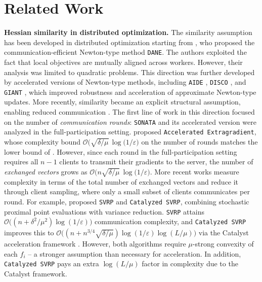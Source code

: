 \documentclass{article}
\begin{document}
\section{Related Work} 
\textbf{Hessian similarity in distributed optimization.} The similarity 
assumption has been developed in distributed optimization starting from 
\cite{shamir2014communication}, who proposed the communication-efficient 
Newton-type method \texttt{DANE}. The authors exploited the fact that local 
objectives are mutually aligned across workers. However, their analysis was 
limited to quadratic problems. This direction was further developed by 
accelerated versions of Newton-type methods, including \texttt{AIDE} 
\cite{reddi2016aide}, \texttt{DISCO} \cite{pmlr-v37-zhangb15}, and 
\texttt{GIANT} \cite{wang2018giant}, which improved robustness and 
acceleration of approximate Newton-type updates. More recently, similarity 
became an explicit structural assumption, enabling reduced communication 
\cite{tian2022acceleration}. The first line of work in this direction 
focused on the number of \textit{communication rounds}: \texttt{SONATA} 
\cite{sun2022distributed} and its accelerated version 
\cite{tian2022acceleration} were analyzed in the full-participation setting. 
\cite{kovalev2022optimal} proposed \texttt{Accelerated Extragradient}, whose complexity bound $\mathcal{O}\bigl(\sqrt{\delta/\mu} \, \log(1/ \varepsilon \bigr)$ 
on the number of rounds matches the lower bound of 
\cite{arjevani2015communication}. However, since each round in the 
full-participation setting requires all $n-1$ clients to transmit their 
gradients to the server, the number of \textit{exchanged vectors} grows as 
$\mathcal{O}\bigl(n\sqrt{\delta/\mu} \, \log(1/ \varepsilon\bigr)$. More recent works 
measure complexity in terms of the total number of exchanged vectors and 
reduce it through client sampling, where only a small subset of clients 
communicates per round. For example, \cite{khaled2022faster} proposed 
\texttt{SVRP} and \texttt{Catalyzed SVRP}, combining stochastic proximal 
point evaluations with variance reduction. \texttt{SVRP} attains 
$\mathcal{O}\bigl((n + \delta^{2}/\mu^{2})\log(1/\varepsilon)\bigr)$ 
communication complexity, and \texttt{Catalyzed SVRP} improves this to 
$\mathcal{O}\bigl((n + n^{3/4}\sqrt{\delta/\mu})\log(1/\varepsilon)\log(L/\mu)\bigr)$ 
via the Catalyst acceleration framework \cite{lin2015universal}. However, 
both algorithms require $\mu$-strong convexity of each $f_i$ -- a stronger assumption than necessary for acceleration. In addition, 
\texttt{Catalyzed SVRP} pays an extra $\log(L/\mu)$ factor in complexity 
due to the Catalyst framework.
\end{document}
